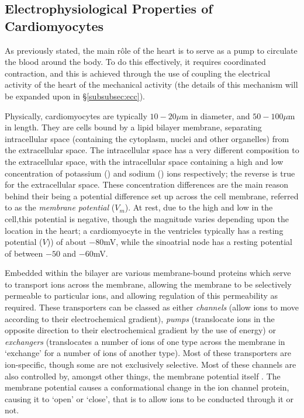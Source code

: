 \documentclass[../thesis-main.tex]{subfiles}
\begin{document}
 \subsection{Electrophysiological Properties of Cardiomyocytes}
 \label{subsec:electro-prop}
 As previously stated, the main r\^ole of the heart is to serve as a pump to circulate the blood around the body. To do this effectively, it requires coordinated contraction, and this is achieved through the use of coupling the electrical activity of the heart of the mechanical activity (the details of this mechanism will be expanded upon in \S\ref{subsubsec:ecc}).
 
 Physically, cardiomyocytes are typically $10-20\mu$m in diameter, and $50-100\mu$m in length. They are cells bound by a lipid bilayer membrane, separating intracellular space (containing the cytoplasm, nuclei and other organelles) from the extracellular space. The intracellular space has a very different composition to the extracellular space, with the intracellular space containing a high and low concentration of potassium (\K) and sodium (\na) ions respectively; the reverse is true for the extracellular space. These concentration differences are the main reason behind their being a potential difference set up across the cell membrane, referred to as the \emph{membrane potential} ($V_m$). At rest, due to the high \K{} and low \na{} in the cell,this potential is negative, though the magnitude varies depending upon the location in the heart; a cardiomyocyte in the ventricles typically has a resting potential ($V$)) of about $-80$mV, while the sinoatrial node has a resting potential of between $-50$ and $-60$mV.
 
 Embedded within the bilayer are various membrane-bound proteins which serve to transport ions across the membrane, allowing the membrane to be selectively permeable to particular ions, and allowing regulation of this permeability as required. These transporters can be classed as either \emph{channels} (allow ions to move according to their electrochemical gradient), \emph{pumps} (translocate ions in the opposite direction to their electrochemical gradient by the use of energy) or \emph{exchangers} (translocates a number of ions of one type across the membrane in `exchange' for a number of ions of another type). Most of these transporters are ion-specific, though some are not exclusively selective. Most of these channels are also controlled by, amongst other things, the membrane potential itself \citep{Bezanilla2000}. The membrane potential causes a conformational change in the ion channel protein, causing it to `open' or `close', that is to allow ions to be conducted through it or not.
 
\end{document}
